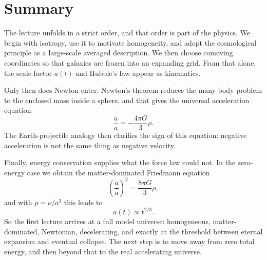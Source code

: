 \section{Summary}

The lecture unfolds in a strict order, and that order is part of the physics. We begin with isotropy, use it to motivate homogeneity, and adopt the cosmological principle as a large-scale averaged description. We then choose comoving coordinates so that galaxies are frozen into an expanding grid. From that alone, the scale factor \(a(t)\) and Hubble's law appear as kinematics.

Only then does Newton enter. Newton's theorem reduces the many-body problem to the enclosed mass inside a sphere, and that gives the universal acceleration equation
\begin{equation}
\frac{\ddot a}{a}=-\frac{4\pi G}{3}\rho.
\end{equation}
The Earth-projectile analogy then clarifies the sign of this equation: negative acceleration is not the same thing as negative velocity.

Finally, energy conservation supplies what the force law could not. In the zero-energy case we obtain the matter-dominated Friedmann equation
\begin{equation}
\left(\frac{\dot a}{a}\right)^2=\frac{8\pi G}{3}\rho,
\end{equation}
and with \(\rho=\nu/a^3\) this leads to
\begin{equation}
a(t)\propto t^{2/3}.
\end{equation}
So the first lecture arrives at a full model universe: homogeneous, matter-dominated, Newtonian, decelerating, and exactly at the threshold between eternal expansion and eventual collapse. The next step is to move away from zero total energy, and then beyond that to the real accelerating universe.